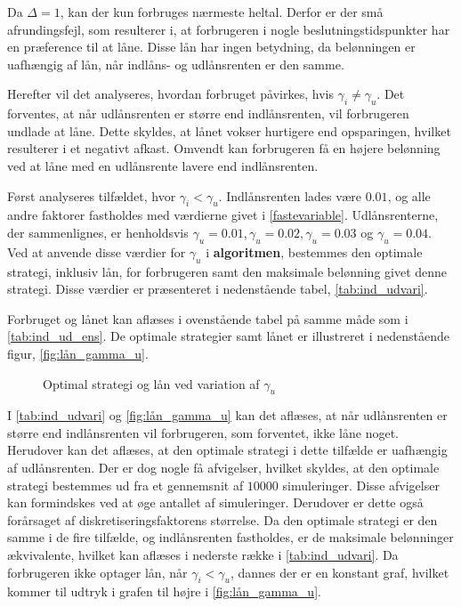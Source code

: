 Da $\Delta = 1$, kan der kun forbruges nærmeste heltal. Derfor er der små afrundingsfejl, som resulterer i, at forbrugeren i nogle beslutningstidspunkter har en præference til at låne. Disse lån har ingen betydning, da belønningen er uafhængig af lån, når indlåns- og udlånsrenten er den samme. 



Herefter vil det analyseres, hvordan forbruget påvirkes, hvis $\gamma_i \neq \gamma_u$. Det forventes, at når udlånsrenten er større end indlånsrenten, vil forbrugeren undlade at låne. Dette skyldes, at lånet vokser hurtigere end opsparingen, hvilket resulterer i et negativt afkast. Omvendt kan forbrugeren få en højere belønning ved at låne med en udlånsrente lavere end indlånsrenten.

Først analyseres tilfældet, hvor $\gamma_i < \gamma_u$. Indlånsrenten lades være $0.01$, og alle andre faktorer fastholdes med værdierne givet i \eqref{fastevariable}. Udlånsrenterne, der sammenlignes, er henholdsvis $\gamma_u = 0.01, \gamma_u = 0.02, \gamma_u = 0.03$ og $\gamma_u = 0.04$. Ved at anvende disse værdier for $\gamma_u$ i \textbf{algoritmen}, bestemmes den optimale strategi, inklusiv lån, for forbrugeren samt den maksimale belønning givet denne strategi. Disse værdier er præsenteret i nedenstående tabel, \autoref{tab:ind_udvari}.



Forbruget og lånet kan aflæses i ovenstående tabel på samme måde som i \autoref{tab:ind_ud_ens}. De optimale strategier samt lånet er illustreret i nedenstående figur, \autoref{fig:lån_gamma_u}. 

% 
\begin{figure}[H]
    \begin{center}
        \resizebox{8cm}{!}{}
        \resizebox{8cm}{!}{}
    \end{center}
    \caption{Optimal strategi og lån ved variation af $\gamma_u$}\label{fig:lån_gamma_u}
\end{figure}

I \autoref{tab:ind_udvari} og \autoref{fig:lån_gamma_u} kan det aflæses, at når udlånsrenten er større end indlånsrenten vil forbrugeren, som forventet, ikke låne noget. Herudover kan det aflæses, at den optimale strategi i dette tilfælde er uafhængig af udlånsrenten. Der er dog nogle få afvigelser, hvilket skyldes, at den optimale strategi bestemmes ud fra et gennemsnit af $10000$ simuleringer. Disse afvigelser kan formindskes ved at øge antallet af simuleringer. Derudover er dette også forårsaget af diskretiseringsfaktorens størrelse. Da den optimale strategi er den samme i de fire tilfælde, og indlånsrenten fastholdes, er de maksimale belønninger ækvivalente, hvilket kan aflæses i nederste række i \autoref{tab:ind_udvari}. Da forbrugeren ikke optager lån, når $\gamma_i < \gamma_u$, dannes der er en konstant graf, hvilket kommer til udtryk i grafen til højre i \autoref{fig:lån_gamma_u}.

